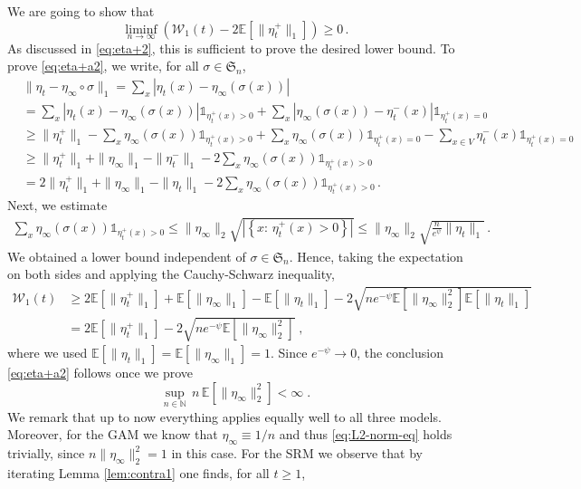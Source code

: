 \documentclass[11pt,reqno]{amsart}
\theoremstyle{remark}
\theoremstyle{definition}
\numberwithin{equation}{section}
\numberwithin{figure}{section}
\newcommand{\E}{\mathds{E}}
\newcommand{\N}{\mathbb{N}}
\newcommand{\fstop}{\; \text{.}}
\newcommand{\comma}{\; \text{,}\;\;}
\newcommand{\quadre}[1]{\left[#1\right]}
\newcommand{\abs}[1]{\left\lvert#1\right\rvert}
\newcommand{\car}{\mathds{1}}
\newcommand{\cW}{\ensuremath{\mathcal W}}
\newcommand{\set}[1]{\left\{#1\right\}}							%
\begin{document}
We are going to show that
\begin{equation}\label{eq:eta+a2}
\liminf_{n\to\infty} 
\left(\cW_1(t)-   2\E\left[\|\eta^{+}_t\|_1\right]\right)\ge0\,.
\end{equation}
As discussed in \eqref{eq:eta+2}, this is sufficient to prove the desired lower bound.  
To prove \eqref{eq:eta+a2}, we write, for all $\sigma \in \mathfrak S_n$,
\begin{align*}
	&\|\eta_t-\eta_\infty\circ\sigma\|_1 = \textstyle\sum_{x} |\eta_t(x)-\eta_\infty(\sigma(x))|\\
	&=\textstyle\sum_{x}\abs{\eta_t(x)-\eta_\infty(\sigma(x))}\car_{\eta_t^+(x)> 0} + \textstyle\sum_{x}\abs{\eta_\infty(\sigma(x))-\eta_t^-(x)}\car_{\eta_t^+(x)=0}\\
	&\ge \|\eta_t^+\|_1
	-\textstyle\sum_{x} \eta_\infty(\sigma(x))\car_{\eta_t^+(x)>0} + \textstyle\sum_{x}\eta_\infty(\sigma(x))\car_{\eta_t^+(x)=0}-\sum_{x\in V}\eta_t^-(x)\car_{\eta_t^+(x)=0}\\
	&\ge \|\eta_t^+\|_1 +\|\eta_\infty\|_1-\|\eta_t^-\|_1-2\textstyle\sum_{x}\eta_\infty(\sigma(x))\car_{\eta_t^+(x)>0}\\
	&= 2\|\eta_t^+\|_1+\|\eta_\infty\|_1-\|\eta_t\|_1 - 2\textstyle\sum_{x}\eta_\infty(\sigma(x))\car_{\eta_t^+(x)>0}\,.
\end{align*}
Next, we estimate 
\begin{align*}
\textstyle\sum_{x}\eta_\infty(\sigma(x))\car_{\eta_t^+(x)>0}\le \|\eta_\infty\|_2\sqrt{\abs{\set{x:\,\eta_t^+(x)>0}}}\le \|\eta_\infty\|_2 \sqrt{\frac{n}{e^\psi}\|\eta_t\|_1}\,.
\end{align*}
We obtained a lower bound independent of  $\sigma\in \mathfrak S_n$. Hence, taking the expectation on both sides and applying the Cauchy-Schwarz inequality,
\begin{align}
	\cW_1(t)&\ge 2 \E[\|\eta_t^+\|_1]+\E[\|\eta_\infty\|_1]-\E[\|\eta_t\|_1]-2\sqrt{ne^{-\psi}\E\quadre{\|\eta_\infty\|_2^2} \E[\|\eta_t\|_1]}\\
	&= 2 \E[\|\eta_t^+\|_1]-2\sqrt{ne^{-\psi}\E\quadre{\|\eta_\infty\|_2^2}} \comma
\end{align}
where we used $\E[\|\eta_t\|_1]=\E[\|\eta_\infty\|_1]=1$. Since $e^{-\psi}\to0$, the conclusion \eqref{eq:eta+a2} follows once we  prove
\begin{equation}\label{eq:L2-norm-eq}
	\sup_{n\in \N} \,n\,\E\quadre{\|\eta_\infty\|_2^2}<\infty\fstop
\end{equation} 
We remark that up to now everything applies equally well to all three models. Moreover, for the GAM we know that $\eta_\infty\equiv 1/n$ and thus \eqref{eq:L2-norm-eq} holds trivially, since $n\|\eta_\infty\|_2^2=1$ in this case. For the SRM we observe that by iterating Lemma \ref{lem:contra1} one finds, for all $t\ge 1$,
\end{document}
